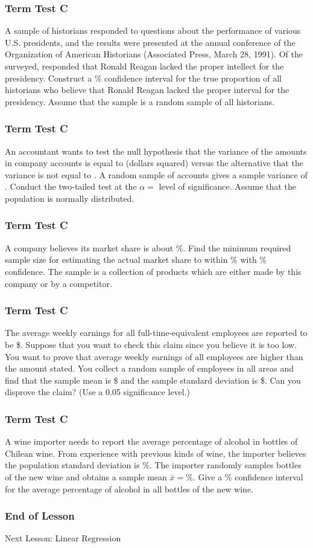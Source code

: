 \documentclass[xcolor=dvipsnames]{beamer}
\begin{document}
\begin{frame}
  \frametitle{Term Test C}
{\ubung} A sample of {\ufoj} historians responded to questions
about the performance of various U.S. presidents, and the results were
presented at the annual conference of the Organization of American
Historians (Associated Press, March 28, 1991). Of the {\ufoj}
surveyed, {\mair} responded that Ronald Reagan lacked the proper
intellect for the presidency. Construct a {\utit}\% confidence
interval for the true proportion of all historians who believe that
Ronald Reagan lacked the proper interval for the presidency. Assume
that the sample is a random sample of all historians.
\end{frame}

\begin{frame}
  \frametitle{Term Test C}
{\ubung} An accountant wants to test the null hypothesis that the
variance of the amounts in company accounts is equal to {\jief}
(dollars squared) versus the alternative that the variance is not
equal to {\jief}. A random sample of {\caib} accounts gives a sample
variance of {\eizi}. Conduct the two-tailed test at the
$\alpha=${\afie} level of significance. Assume that the population is
normally distributed.
\end{frame}

\begin{frame}
  \frametitle{Term Test C}
{\ubung} A company believes its market share is about {\uphe}\%.
Find the minimum required sample size for estimating the actual market
share to within {\kieg}\% with {\aequ}\% confidence. The sample is a
collection of products which are either made by this company or by a
competitor.
\end{frame}

\begin{frame}
  \frametitle{Term Test C}
{\ubung} The average weekly earnings for all full-time-equivalent
employees are reported to be \${\aiza}. Suppose that you want to check
this claim since you believe it is too low. You want to prove that
average weekly earnings of all employees are higher than the amount
stated. You collect a random sample of {\ajoo} employees in all areas
and find that the sample mean is \${\icoo} and the sample standard
deviation is \${\phae}. Can you disprove the claim? (Use a 0.05
significance level.)
\end{frame}

\begin{frame}
  \frametitle{Term Test C}
{\ubung} A wine importer needs to report the average percentage of
alcohol in bottles of Chilean wine. From experience with previous
kinds of wine, the importer believes the population standard deviation
is {\usha}\%. The importer randomly samples {\oaga} bottles of the new
wine and obtains a sample mean $\bar{x}=${\cait}\%. Give a {\viob}\%
confidence interval for the average percentage of alcohol in all
bottles of the new wine.
\end{frame}

\begin{frame}
  \frametitle{End of Lesson}
Next Lesson: Linear Regression
\end{frame}
\end{document}
